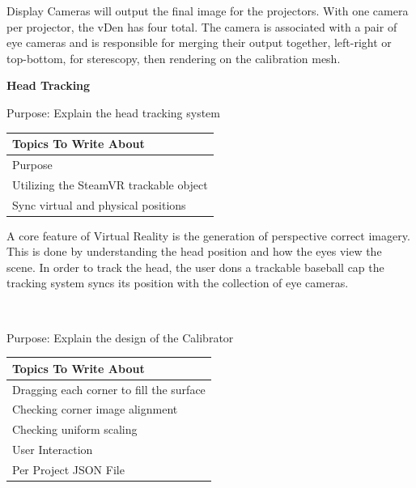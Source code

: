 Display Cameras will output the final image for the projectors. With one camera per projector, the vDen has four total. The camera is associated with a pair of eye cameras and is responsible for merging their output together, left-right or top-bottom, for sterescopy, then rendering on the calibration mesh.


\filbreak
\noindent\textbf{Head Tracking} \\
\begin{center}
	\textcolor{OliveGreen} {
		Purpose: Explain the head tracking system
	}
	
	\begin{table}[H]
		\centering
		\renewcommand\arraystretch{0.5}
		\begin{tabular}{|l|}
			\hline 
			Topics To Write About \\ 
			\hline 
			Purpose \\
			Utilizing the SteamVR trackable object \\
			Sync virtual and physical positions \\
			\hline 
		\end{tabular}
	\end{table}
\end{center}

A core feature of Virtual Reality is the generation of perspective correct imagery. This is done by understanding the head position and how the eyes view the scene. In order to track the head, the user dons a trackable baseball cap the tracking system syncs its position with the collection of eye cameras.


\filbreak
{}\label{sec:CalibratorSection} \\
\begin{center}
	\textcolor{OliveGreen}{
		Purpose: Explain the design of the Calibrator
	}
	
	\begin{table}[H]
		\centering
		\renewcommand\arraystretch{0.5}
		\begin{tabular}{|l|}
			\hline 
			Topics To Write About \\ 
			\hline 
			Dragging each corner to fill the surface \\
			Checking corner image alignment \\
			Checking uniform scaling \\
			User Interaction \\
			Per Project JSON File\\
			\hline 
		\end{tabular}
	\end{table}
\end{center}

